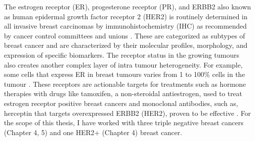 The estrogen receptor (ER), progesterone receptor (PR), and ERBB2 also known as human epidermal growth factor receptor 2 (HER2) is routinely determined in all invasive breast carcinomas by immunohistochemistry (IHC) as recommended by cancer control committees and unions \cite{turashvili2017tumor, hammond2010college, wolff2013american}. These are categorized as subtypes of breast cancer and are characterized by their molecular profiles, morphology, and expression of specific biomarkers. The receptor status in the growing tumours also creates another complex layer of intra tumour heterogeneity. For example, some cells that express ER in breast tumours varies from 1 to 100\% cells in the tumour \cite{januvskevivciene2019heterogeneity, visvader2011cells}. These receptors are actionable targets for treatments such as hormone therapies with drugs like tamoxifen, a non-steroidal antiestrogen, used to treat estrogen receptor positive breast cancers \cite{jordan2003tamoxifen,fisher2005tamoxifen} and monoclonal antibodies, such as, herceptin that targets overexpressed ERBB2 (HER2), proven to be effective \cite{piccart2005trastuzumab,slamon2011adjuvant}.  
For the scope of this thesis, I have worked with three triple negative breast cancers (Chapter 4, 5) and one HER2+ (Chapter 4) breast cancer.

